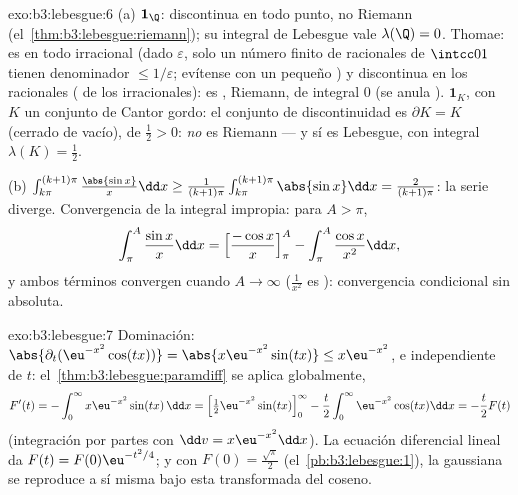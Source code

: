 \begin{solution}{exo:b3:lebesgue:6}
(a) $\mathbf 1_\Q$: discontinua en todo punto, no
 Riemann
(el~\cref{thm:b3:lebesgue:riemann}); su integral de Lebesgue vale
$\lambda(\Q) = 0$. Thomae: es
 en todo irracional (dado
$\varepsilon$, solo un número finito de racionales de $\intcc01$ tienen
denominador $\leq
1/\varepsilon$; evítense con un pequeño
) y discontinua en los
racionales ( de los
irracionales): es  ,  Riemann, de integral
$0$ (se anula ). $\mathbf 1_K$, con $K$ un conjunto de
Cantor gordo: el conjunto de discontinuidad es $\partial K = K$ (cerrado
de  vacío), de
 $\frac12 > 0$: \emph{no} es
 Riemann --- y sí es
 Lebesgue, con integral
$\lambda(K) = \frac12$.

(b) $\int_{k\pi}^{(k+1)\pi}\frac{\abs{\sin x}}x\dd x \geq
\frac1{(k+1)\pi}\int_{k\pi}^{(k+1)\pi}\abs{\sin x}\dd x =
\frac{2}{(k+1)\pi}$: la serie diverge. Convergencia de la integral
impropia: para $A > \pi$,
\[
\int_\pi^A\frac{\sin x}x\dd x = \Bigl[\frac{-\cos
x}x\Bigr]_\pi^A - \int_\pi^A\frac{\cos x}{x^2}\dd x,
\]
y ambos términos convergen cuando $A \to \infty$ ($\frac1{x^2}$ es
): convergencia condicional sin
 absoluta.
\end{solution}

\begin{solution}{exo:b3:lebesgue:7}
Dominación: $\abs{\partial_t(\eu^{-x^2}\cos(tx))} =
\abs{x\eu^{-x^2}\sin(tx)} \leq x\eu^{-x^2}$,
 e independiente de $t$:
el~\cref{thm:b3:lebesgue:paramdiff} se aplica globalmente,
\[
F'(t) = -\int_0^\infty x\eu^{-x^2}\sin(tx)\,\dd x
= \Bigl[\tfrac12\eu^{-x^2}\sin(tx)\Bigr]_0^\infty
- \frac t2\int_0^\infty\eu^{-x^2}\cos(tx)\dd x
= -\frac t2F(t)
\]
(integración por partes con $\dd v = x\eu^{-x^2}\dd x$). La ecuación
diferencial lineal da $F(t) = F(0)\eu^{-t^2/4}$; y con $F(0) =
\frac{\sqrt\pi}2$ (el~\cref{pb:b3:lebesgue:1}), la gaussiana se
reproduce a sí misma bajo esta transformada del coseno.
\end{solution}

